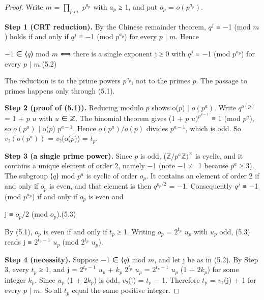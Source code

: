 \documentclass[pdflatex,sn-mathphys-num]{sn-jnl}
\theoremstyle{thmstyleone}
\theoremstyle{thmstylethree}
\begin{document}
\begin{proof}[Proof]

Write \(m\) = \(∏_{p|m}\) \(p^{a_p}\) with \(a_p\) ≥ 1, and put \(o_p\) = \(o(p^{a_p})\).

\textbf{Step 1 (CRT reduction).} By the Chinese remainder theorem, \(q^j\) ≡ −1 (mod \(m\)) holds if and only if \(q^j\) ≡ −1 (mod \(p^{a_p}\)) for every \(p\) \(\mid\) \(m\). Hence

\begin{center}−1 ∈ ⟨\(q\)⟩ mod \(m\) ⟺ there is a single exponent j ≥ 0 with \(q^j\) ≡ −1 (mod \(p^{a_p}\)) for every \(p\) \(\mid\) \(m\).\qquad (5.2)\end{center}

The reduction is to the prime powers \(p^{a_p}\), not to the primes \(p\). The passage to primes happens only through (5.1).

\textbf{Step 2 (proof of (5.1)).} Reducing modulo \(p\) shows o(\(p\)) \(\mid\) \(o(p^a)\). Write \(q^{o(p)}\) = 1 + \(p\) \(u\) with \(u\) ∈ ℤ. The binomial theorem gives (1 + \(p\) \(u)^{p^{a−1}}\) ≡ 1 (mod \(p^a\)), so \(o(p^a)\) \(\mid\) o(\(p\)) \(p^{a−1}\). Hence \(o(p^a)/o(p)\) divides \(p^{a−1}\), which is odd. So \(v₂(o(p^a))\) = \(v\)₂(o(\(p\))) = \(t_p\).

\textbf{Step 3 (a single prime power).} Since \(p\) is odd, (\(ℤ/p^aℤ)^×\) is cyclic, and it contains a unique element of order 2, namely −1 (note −1 ≢ 1 because \(p^a\) ≥ 3). The subgroup ⟨\(q\)⟩ mod \(p^a\) is cyclic of order \(o_p\). It contains an element of order 2 if and only if \(o_p\) is even, and that element is then \(q^{o_p/2}\) = −1. Consequently \(q^j\) ≡ −1 (mod \(p^{a_p}\)) if and only if \(o_p\) is even and

\begin{center}j ≡ \(o_p/2\) (mod \(o_p\)).\qquad (5.3)\end{center}

By (5.1), \(o_p\) is even if and only if \(t_p\) ≥ 1. Writing \(o_p\) = \(2^{t_p}\) \(u_p\) with \(u_p\) odd, (5.3) reads j ≡ \(2^{t_p−1}\) \(u_p\) (mod \(2^{t_p}\) \(u_p\)).

\textbf{Step 4 (necessity).} Suppose −1 ∈ ⟨\(q\)⟩ mod \(m\), and let j be as in (5.2). By Step 3, every \(t_p\) ≥ 1, and j = \(2^{t_p−1}\) \(u_p\) + \(k_p\) \(2^{t_p}\) \(u_p\) = \(2^{t_p−1}\) \(u_p\) (1 + \(2k_p\)) for some integer \(k_p\). Since \(u_p\) (1 + \(2k_p\)) is odd, \(v\)₂(j) = \(t_p\) − 1. Therefore \(t_p\) = \(v\)₂(j) + 1 for every \(p\) \(\mid\) \(m\). So all \(t_p\) equal the same positive integer.


\end{proof}
\end{document}

